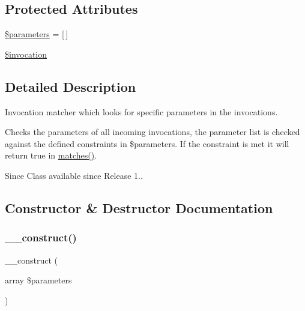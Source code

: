 \subsection*{Protected Attributes}
\begin{DoxyCompactItemize}
\item 
\mbox{\hyperlink{class_p_h_p_unit___framework___mock_object___matcher___parameters_ab79d246480c4ac3a0db6bbceca92ad32}{\$parameters}} = \mbox{[}$\,$\mbox{]}
\item 
\mbox{\hyperlink{class_p_h_p_unit___framework___mock_object___matcher___parameters_a7323dd21d8c8d46bcc56fcb5f4230cf8}{\$invocation}}
\end{DoxyCompactItemize}


\subsection{Detailed Description}
Invocation matcher which looks for specific parameters in the invocations.

Checks the parameters of all incoming invocations, the parameter list is checked against the defined constraints in \$parameters. If the constraint is met it will return true in \mbox{\hyperlink{class_p_h_p_unit___framework___mock_object___matcher___parameters_a4988c6fa11e275302172d0a4ae32dd3a}{matches()}}.

\begin{DoxySince}{Since}
Class available since Release 1.. 
\end{DoxySince}


\subsection{Constructor \& Destructor Documentation}
\mbox{\label{class_p_h_p_unit___framework___mock_object___matcher___parameters_aa296d9661863e041aa9c31aad768ad8f}} 
\subsubsection{\texorpdfstring{\+\_\+\+\_\+construct()}{\_\_construct()}}
{\footnotesize\ttfamily \+\_\+\+\_\+construct (\begin{DoxyParamCaption}\item[{array}]{\$parameters }\end{DoxyParamCaption})}


